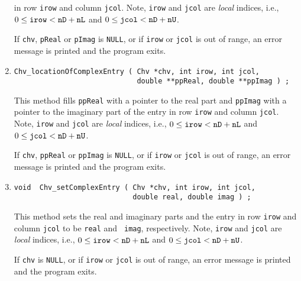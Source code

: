 \begin{enumerate}
in row {\tt irow} and column {\tt jcol}.
Note, {\tt irow} and {\tt jcol} are {\it local} indices,
i.e., $0 \le \mbox{\tt irow} < \mbox{\tt nD} + \mbox{\tt nL}$
and $0 \le \mbox{\tt jcol} < \mbox{\tt nD} + \mbox{\tt nU}$.
\par {}
If {\tt chv}, {\tt pReal} or {\tt pImag} is {\tt NULL},
or if {\tt irow} or {\tt jcol} is out of range,
an error message is printed and the program exits.
\item
\begin{verbatim}
Chv_locationOfComplexEntry ( Chv *chv, int irow, int jcol,
                             double **ppReal, double **ppImag ) ;
\end{verbatim}
This method fills {\tt *ppReal} with a pointer to the real part
and {\tt *ppImag} with a pointer to the imaginary part of
the entry in row {\tt irow} and column {\tt jcol}.
Note, {\tt irow} and {\tt jcol} are {\it local} indices,
i.e., $0 \le \mbox{\tt irow} < \mbox{\tt nD} + \mbox{\tt nL}$
and $0 \le \mbox{\tt jcol} < \mbox{\tt nD} + \mbox{\tt nU}$.
\par {}
If {\tt chv}, {\tt ppReal} or {\tt ppImag} is {\tt NULL},
or if {\tt irow} or {\tt jcol} is out of range,
an error message is printed and the program exits.
\item
\begin{verbatim}
void  Chv_setComplexEntry ( Chv *chv, int irow, int jcol, 
                            double real, double imag ) ;
\end{verbatim}
This method sets the real and imaginary parts and the entry 
in row {\tt irow} and column {\tt jcol} to be {\tt real} and {\tt
imag}, respectively.
Note, {\tt irow} and {\tt jcol} are {\it local} indices,
i.e., $0 \le \mbox{\tt irow} < \mbox{\tt nD} + \mbox{\tt nL}$
and $0 \le \mbox{\tt jcol} < \mbox{\tt nD} + \mbox{\tt nU}$.
\par {}
If {\tt chv} is {\tt NULL},
or if {\tt irow} or {\tt jcol} is out of range,
an error message is printed and the program exits.
\end{enumerate}
\par
